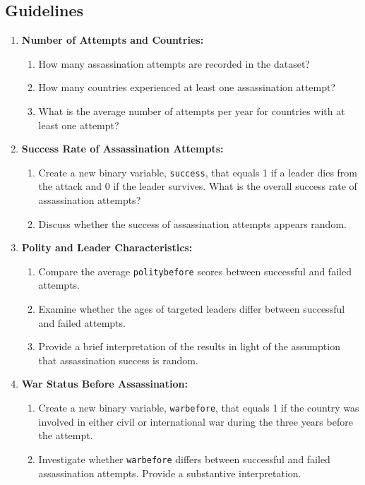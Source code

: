 \documentclass[12pt]{article}
\begin{document}
\subsection*{Guidelines}
\begin{enumerate}
    \item \textbf{Number of Attempts and Countries:} 
    \begin{enumerate}
        \item How many assassination attempts are recorded in the dataset?
        \item How many countries experienced at least one assassination attempt?
        \item What is the average number of attempts per year for countries with at least one attempt?
    \end{enumerate}
    
    \item \textbf{Success Rate of Assassination Attempts:} 
    \begin{enumerate}
        \item Create a new binary variable, \texttt{success}, that equals 1 if a leader dies from the attack and 0 if the leader survives. What is the overall success rate of assassination attempts?
        \item Discuss whether the success of assassination attempts appears random.
    \end{enumerate}
    
    \item \textbf{Polity and Leader Characteristics:}
    \begin{enumerate}
        \item Compare the average \texttt{politybefore} scores between successful and failed attempts.
        \item Examine whether the ages of targeted leaders differ between successful and failed attempts.
        \item Provide a brief interpretation of the results in light of the assumption that assassination success is random.
    \end{enumerate}
    
    \item \textbf{War Status Before Assassination:}
    \begin{enumerate}
        \item Create a new binary variable, \texttt{warbefore}, that equals 1 if the country was involved in either civil or international war during the three years before the attempt.
        \item Investigate whether \texttt{warbefore} differs between successful and failed assassination attempts. Provide a substantive interpretation.
    \end{enumerate}
    

\end{enumerate}
\end{document}
